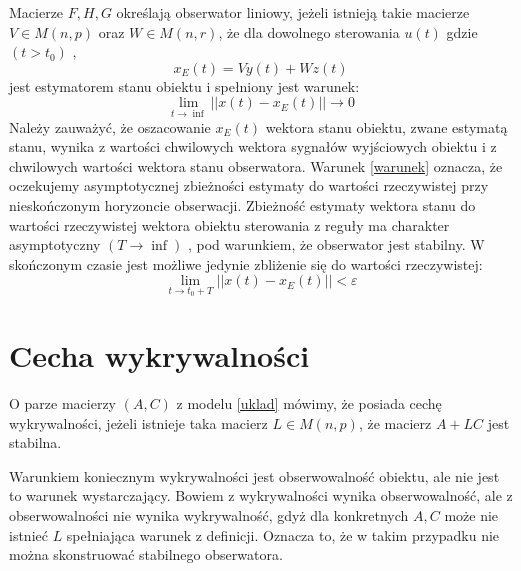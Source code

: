 \documentclass{article}
\begin{document}
		Macierze $F, H, G$ określają obserwator liniowy, jeżeli istnieją takie macierze $V \in M(n, p)$
		oraz $W \in M(n, r)$, że dla dowolnego sterowania $u(t)$ gdzie $(t> t_0)$ ,
		\begin{equation}
			x_E(t) = V y(t) + W z(t)
		\end{equation}
		jest estymatorem stanu obiektu i spełniony jest warunek:
		\begin{equation}
			\lim_{t \to \inf} \left. \left. \right\vert \right\vert 
			x(t) - x_E(t) 
			\left. \left. \right\vert \right\vert 
			\to
			0
			\label{warunek}
		\end{equation}
		Należy zauważyć, że oszacowanie $x_E (t)$ wektora stanu obiektu, zwane estymatą 
		stanu, wynika z wartości chwilowych wektora sygnałów
		wyjściowych obiektu i z chwilowych wartości wektora stanu obserwatora. Warunek \eqref{warunek}
		oznacza, że oczekujemy asymptotycznej zbieżności estymaty do wartości rzeczywistej
		przy nieskończonym horyzoncie obserwacji. Zbieżność estymaty wektora stanu do
		wartości rzeczywistej wektora obiektu sterowania z reguły ma charakter asymptotyczny
		$(T \to \inf)$ , pod warunkiem, że obserwator jest stabilny.
		W skończonym czasie jest możliwe jedynie zbliżenie się do wartości rzeczywistej:
		\begin{equation}
			\lim_{t \to t_0+T} \left. \left. \right\vert \right\vert 
			x(t) - x_E(t) 
			\left. \left. \right\vert \right\vert 
			< \varepsilon
		\end{equation}
	\section{Cecha wykrywalności}
		O parze macierzy $(A, C)$ z modelu \ref{uklad} mówimy, że posiada cechę wykrywalności, jeżeli
		istnieje taka macierz $L \in M(n, p)$, że macierz $A + LC$ jest stabilna.

		Warunkiem koniecznym wykrywalności jest obserwowalność obiektu, ale nie jest to
		warunek wystarczający. Bowiem z wykrywalności wynika obserwowalność, ale z
		obserwowalności nie wynika wykrywalność, gdyż dla konkretnych $A, C$ może nie istnieć
		$L$ spełniająca warunek z definicji. Oznacza to, że w takim przypadku nie można
		skonstruować stabilnego obserwatora.
\end{document}
